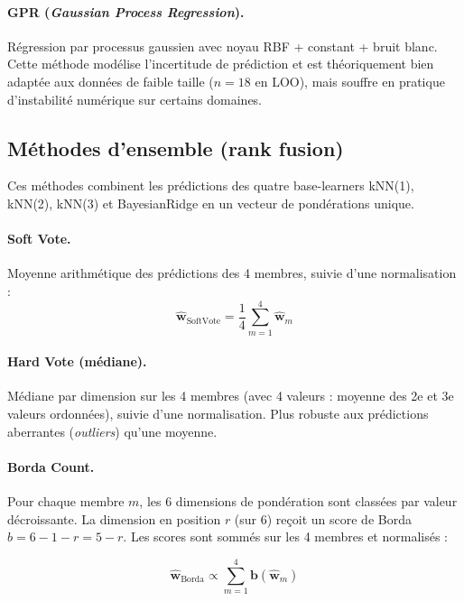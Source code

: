 \paragraph{GPR (\textit{Gaussian Process Regression}).}
Régression par processus gaussien avec noyau RBF + constant + bruit blanc.
Cette méthode modélise l'incertitude de prédiction et est théoriquement
bien adaptée aux données de faible taille ($n = 18$ en LOO), mais souffre
en pratique d'instabilité numérique sur certains domaines.

\subsection{Méthodes d'ensemble (rank fusion)}

Ces méthodes combinent les prédictions des quatre base-learners
kNN(1), kNN(2), kNN(3) et BayesianRidge en un vecteur de pondérations
unique.

\paragraph{Soft Vote.} Moyenne arithmétique des prédictions des 4 membres,
suivie d'une normalisation :
\begin{equation}
  \hat{\mathbf{w}}_{\text{SoftVote}} = \frac{1}{4} \sum_{m=1}^{4} \hat{\mathbf{w}}_m
  \label{eq:soft_vote}
\end{equation}

\paragraph{Hard Vote (médiane).} Médiane par dimension sur les 4 membres
(avec 4 valeurs : moyenne des 2e et 3e valeurs ordonnées), suivie d'une
normalisation. Plus robuste aux prédictions aberrantes (\textit{outliers})
qu'une moyenne.

\paragraph{Borda Count.} Pour chaque membre $m$, les 6 dimensions de
pondération sont classées par valeur décroissante. La dimension en
position $r$ (sur 6) reçoit un score de Borda $b = 6 - 1 - r = 5 - r$.
Les scores sont sommés sur les 4 membres et normalisés :

\begin{equation}
  \hat{\mathbf{w}}_{\text{Borda}} \propto \sum_{m=1}^{4}
  \mathbf{b}(\hat{\mathbf{w}}_m)
  \label{eq:borda}
\end{equation}

